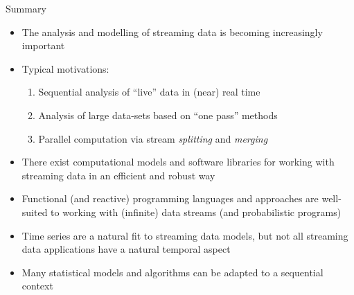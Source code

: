 \begin{frame}{Summary}
\protect\hypertarget{summary}{}

\begin{itemize}
\tightlist
\item
  The analysis and modelling of streaming data is becoming increasingly
  important
\item
  Typical motivations:

  \begin{enumerate}
  \tightlist
  \item
    Sequential analysis of ``live'' data in (near) real time
  \item
    Analysis of large data-sets based on ``one pass'' methods
  \item
    Parallel computation via stream \emph{splitting} and \emph{merging}
  \end{enumerate}
\item
  There exist computational models and software libraries for working
  with streaming data in an efficient and robust way
\item
  Functional (and reactive) programming languages and approaches are
  well-suited to working with (infinite) data streams (and probabilistic
  programs)
\item
  Time series are a natural fit to streaming data models, but not all
  streaming data applications have a natural temporal aspect
\item
  Many statistical models and algorithms can be adapted to a sequential
  context
\end{itemize}

\end{frame}
